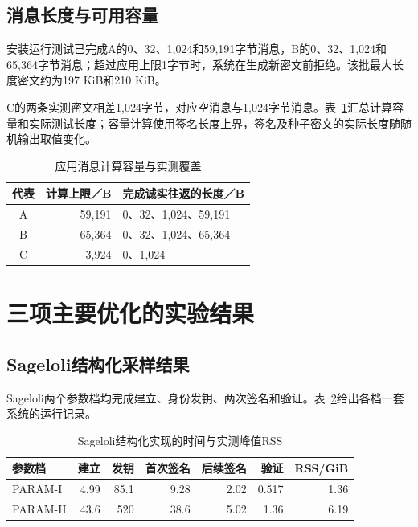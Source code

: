 \subsection{消息长度与可用容量}
安装运行测试已完成A的0、32、1,024和59,191字节消息，B的0、32、1,024和65,364字节消息；超过应用上限1字节时，系统在生成新密文前拒绝。该批最大长度密文约为197 KiB和210 KiB。

C的两条实测密文相差1,024字节，对应空消息与1,024字节消息。表~\ref{tab:message-coverage}汇总计算容量和实际测试长度；容量计算使用签名长度上界，签名及种子密文的实际长度随随机输出取值变化。

\begin{table}[H]
\centering\small
\caption{应用消息计算容量与实测覆盖}
\label{tab:message-coverage}
\begin{tabular}{@{}crl@{}}
\toprule
\rowcolor{black!8} 代表 & 计算上限／B & 完成诚实往返的长度／B \\
\midrule
A & 59,191 & 0、32、1,024、59,191 \\
B & 65,364 & 0、32、1,024、65,364 \\
C & 3,924 & 0、1,024 \\
\bottomrule
\end{tabular}
\end{table}

\section{三项主要优化的实验结果}
\subsection{Sageloli结构化采样结果}
Sageloli两个参数档均完成建立、身份发钥、两次签名和验证。表~\ref{tab:sageloli-times}给出各档一套系统的运行记录。

\begin{table}[H]
\centering\small
\caption{Sageloli结构化实现的时间与实测峰值RSS}
\label{tab:sageloli-times}
\begin{tabular}{@{}lrrrrrr@{}}
\toprule
\rowcolor{black!8} 参数档 & 建立 & 发钥 & 首次签名 & 后续签名 & 验证 & RSS/GiB \\
\midrule
PARAM-I & 4.99 & 85.1 & 9.28 & 2.02 & 0.517 & 1.36 \\
PARAM-II & 43.6 & 520 & 38.6 & 5.02 & 1.36 & 6.19 \\
\bottomrule
\end{tabular}
\end{table}

